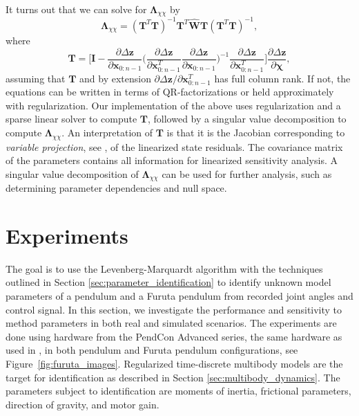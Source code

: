 \documentclass[preprint,12pt]{elsarticle}
\let\vec\bm
\let\mat\mathbf
\def\param{\vec{\chi}}
\newcommand\figref{Figure~\ref}
\numberwithin{equation}{section}
\def\combresiduals{ \Delta \vec{z}}
\begin{document}
It turns out that we can solve for $\mat{\Lambda}_{\chi \chi}$ by
\begin{equation}
    \label{eq:param_cov}
    \vec{\Lambda}_{\chi \chi} =  (\mat{T}^T \mat{T})^{-1} \mat{T}^T \hat{\mat{W}} \mat{T} (\mat{T}^T \mat{T})^{-1},
\end{equation}
where
\begin{equation}
    \mat{T} = \Big[
        \mat{I} - 
        \frac{\partial \combresiduals}{\partial \vec{x}_{0:n-1}}
        \Big(
            \frac{\partial \combresiduals}{\partial \vec{x}_{0:n-1}^T} \frac{\partial \combresiduals}{\partial \vec{x}_{0:n-1}}
        \Big)^{-1} 
        \frac{\partial \combresiduals}{\partial \vec{x}_{0:n-1}^T}
    \Big] \frac{\partial \combresiduals}{\partial \param},
\end{equation}
assuming that $\mat{T}$ and by extension $\partial \combresiduals / \partial \vec{x}_{0:n-1}^T$ has full column rank.
If not, the equations can be written in terms of QR-factorizations or held approximately with regularization.
Our implementation of the above uses regularization and a sparse linear solver to compute $\mat{T}$, followed by a singular value decomposition to compute $\mat{\Lambda}_{\chi \chi}$.
An interpretation of $\mat{T}$ is that it is the Jacobian corresponding to \emph{variable projection}, see \cite{o2013variable}, of the linearized state residuals.
The covariance matrix of the parameters contains all information for linearized sensitivity analysis.
A singular value decomposition of $\vec{\Lambda}_{\chi \chi}$ can be used for further analysis, such as determining parameter dependencies and null space.

\section{Experiments}
\label{sec:case_study}
The goal is to use the Levenberg-Marquardt algorithm with the techniques outlined in Section \ref{sec:parameter_identification} to identify unknown model parameters of a pendulum and a Furuta pendulum from recorded joint angles and control signal.
In this section, we investigate the performance and sensitivity to method parameters in both real and simulated scenarios.
The experiments are done using hardware from the PendCon Advanced series, the same hardware as used in \cite{leonid2017prop}, in both pendulum and Furuta pendulum configurations, see \figref{fig:furuta_images}.
Regularized time-discrete multibody models are the target for identification as described in Section \ref{sec:multibody_dynamics}.
The parameters subject to identification are moments of inertia, frictional parameters, direction of gravity, and motor gain.
\end{document}
